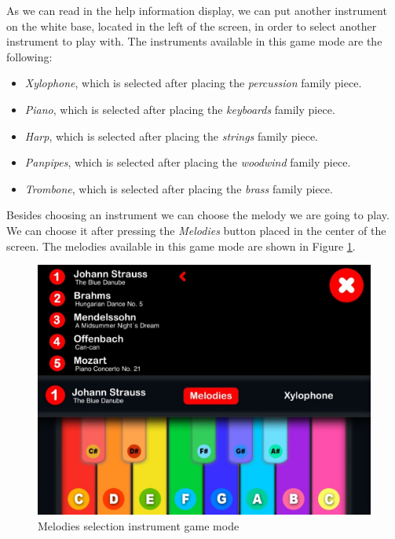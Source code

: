 \FloatBarrier

As we can read in the help information display, we can put another instrument on the white base, located in the left of the screen, in order to select another instrument to play with. The instruments available in this game mode are the following:
\begin{itemize}
\item \textit{Xylophone}, which is selected after placing the \textit{percussion} family piece.
\item \textit{Piano}, which is selected after placing the \textit{keyboards} family piece.
\item \textit{Harp}, which is selected after placing the \textit{strings} family piece.
\item \textit{Panpipes}, which is selected after placing the \textit{woodwind} family piece.
\item \textit{Trombone}, which is selected after placing the \textit{brass} family piece.
\end{itemize}

Besides choosing an instrument we can choose the melody we are going to play. We can choose it after pressing the \textit{Melodies} button placed in the center of the screen. The melodies available in this game mode are shown in Figure \ref{fig:melodies_playing_screen}.

\begin{figure}[ht!]
	\centering
	\includegraphics[width=400pt]{graphics/use-case/melodies_playing_screen.jpg}
	\caption{Melodies selection instrument game mode}
	\label{fig:melodies_playing_screen}
\end{figure}


